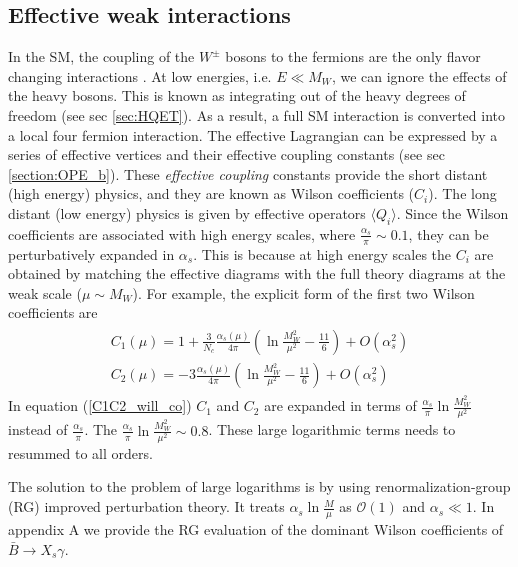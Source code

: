 \subsection{Effective weak interactions}
In the SM, the coupling of the $W^{\pm}$ bosons to the fermions are the only flavor changing interactions \cite{Neubert:2005mu}. At low energies, i.e. $E\ll M_W$, we can ignore the effects of the heavy bosons. This is known as integrating out of the heavy degrees of freedom (see sec \ref{sec:HQET}). As a result, a full SM interaction is converted into a local four fermion interaction. The effective Lagrangian can be expressed by a series of effective vertices and their effective coupling constants (see sec \ref{section:OPE_b}). These \textit{effective coupling} constants provide the short distant (high energy) physics, and they are known as Wilson coefficients ($C_i$). The long distant (low energy) physics is given by effective operators $\langle Q_i \rangle$. Since the Wilson coefficients are associated with high energy scales, where $\frac{\alpha_s}{\pi}\sim 0.1$, they can be perturbatively expanded in $\alpha_s$. This is because at high energy scales the $C_i$ are obtained by matching the effective diagrams with the full theory diagrams at the weak scale ($\mu\sim M_W$). For example, the explicit form of the first two Wilson coefficients are \cite{Neubert:2005mu}
\begin{eqnarray}\label{C1C2_will_co}
\begin{array}{l}
C_{1}(\mu)=1+\frac{3}{N_{c}} \frac{\alpha_{s}(\mu)}{4 \pi}\left(\ln \frac{M_{W}^{2}}{\mu^{2}}-\frac{11}{6}\right)+O\left(\alpha_{s}^{2}\right) \\
C_{2}(\mu)=-3 \frac{\alpha_{s}(\mu)}{4 \pi}\left(\ln \frac{M_{W}^{2}}{\mu^{2}}-\frac{11}{6}\right)+O\left(\alpha_{s}^{2}\right)
\end{array}
\end{eqnarray}
In equation (\ref{C1C2_will_co}) $C_1$ and $C_2$ are expanded in terms of $\frac{\alpha_{s}}{\pi} \ln \frac{M_{W}^{2}}{\mu^{2}}$ instead of $\frac{\alpha_s}{\pi}$. The $\frac{\alpha_{s}}{\pi} \ln \frac{M_{W}^{2}}{\mu^{2}}\sim 0.8$. These large logarithmic terms needs to resummed to all orders.\par
The solution to the problem of large logarithms is by using renormalization-group (RG) improved perturbation theory. It treats $\alpha_{s} \ln \frac{M}{\mu}$ as $\mathcal{O}(1)$ and $\alpha_s\ll 1$. In appendix A we provide the RG evaluation of the dominant Wilson coefficients of $\bar{B}\to X_s \gamma$. 
